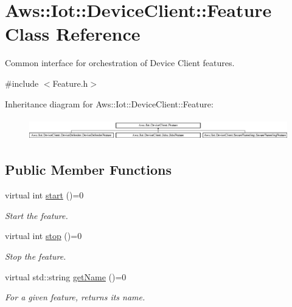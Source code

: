\hypertarget{class_aws_1_1_iot_1_1_device_client_1_1_feature}{}\section{Aws\+:\+:Iot\+:\+:Device\+Client\+:\+:Feature Class Reference}
\label{class_aws_1_1_iot_1_1_device_client_1_1_feature}


Common interface for orchestration of Device Client features.  




{\ttfamily \#include $<$Feature.\+h$>$}

Inheritance diagram for Aws\+:\+:Iot\+:\+:Device\+Client\+:\+:Feature\+:\begin{figure}[H]
\begin{center}
\leavevmode
\includegraphics[height=0.959726cm]{class_aws_1_1_iot_1_1_device_client_1_1_feature}
\end{center}
\end{figure}
\subsection*{Public Member Functions}
\begin{DoxyCompactItemize}
\item 
virtual int \hyperlink{class_aws_1_1_iot_1_1_device_client_1_1_feature_ac9a936ebd88f7e35914a6aac99badf7d}{start} ()=0
\begin{DoxyCompactList}\small\item\em Start the feature. \end{DoxyCompactList}\item 
virtual int \hyperlink{class_aws_1_1_iot_1_1_device_client_1_1_feature_a5b672f7b1403512cad9104ba923fc73d}{stop} ()=0
\begin{DoxyCompactList}\small\item\em Stop the feature. \end{DoxyCompactList}\item 
virtual std\+::string \hyperlink{class_aws_1_1_iot_1_1_device_client_1_1_feature_a7f56b81457898d67ddc1942e57e3c0d5}{get\+Name} ()=0
\begin{DoxyCompactList}\small\item\em For a given feature, returns its name. \end{DoxyCompactList}\end{DoxyCompactItemize}


